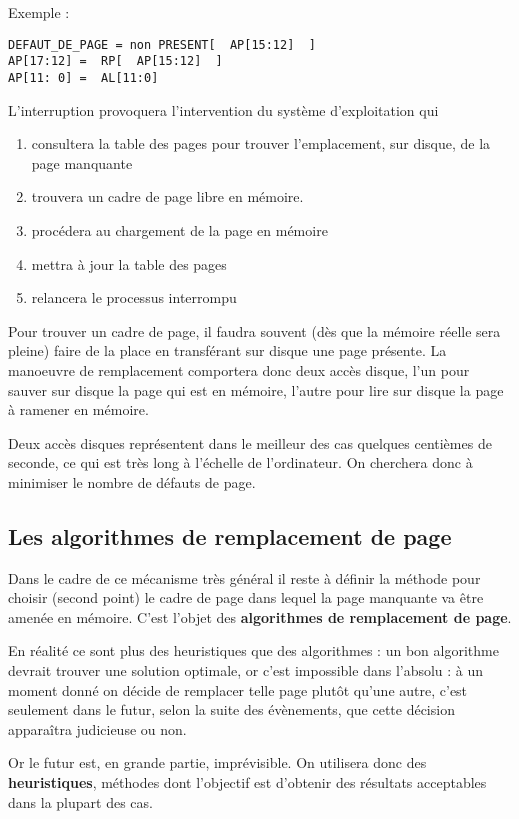 \begin{multicols}{2}
Exemple :

\begin{lstlisting}
DEFAUT_DE_PAGE = non PRESENT[  AP[15:12]  ]
AP[17:12] =  RP[  AP[15:12]  ]
AP[11: 0] =  AL[11:0]
\end{lstlisting}

L'interruption provoquera l'intervention du système d'exploitation qui
\begin{enumerate}
\item consultera la table des pages pour trouver l'emplacement, sur
  disque, de la page manquante
\item trouvera un cadre de page libre en mémoire. 
\item procédera au chargement de la page en mémoire
\item mettra à jour la table des pages
\item relancera le processus interrompu
\end{enumerate}

Pour trouver un cadre de page, il faudra souvent (dès que la mémoire
réelle sera pleine) faire de la place en transférant sur disque une
page présente. La manoeuvre de remplacement comportera donc deux accès
disque, l'un pour sauver sur disque la page qui est en mémoire,
l'autre pour lire sur disque la page à ramener en mémoire.

Deux accès disques représentent dans le meilleur des cas quelques
centièmes de seconde, ce qui est très long à l'échelle de
l'ordinateur. On cherchera donc à minimiser le nombre de  défauts de page.


 
\subsection{Les algorithmes de remplacement de page}

Dans le cadre de ce mécanisme très général il reste à définir la
méthode pour choisir (second point) le cadre de page dans lequel la
page manquante va être amenée en mémoire. C'est l'objet des
\textbf{algorithmes de remplacement de page}.

En réalité ce sont plus des heuristiques que des algorithmes : un bon
algorithme devrait trouver une solution optimale, or c'est impossible
dans l'absolu : à un moment donné on décide de remplacer telle page
plutôt qu'une autre, c'est seulement dans le futur, selon la suite des
évènements, que cette décision apparaîtra
judicieuse ou non.

Or le futur est, en grande partie, imprévisible. On utilisera donc des
\textbf{heuristiques}, méthodes dont l'objectif est d'obtenir des
résultats acceptables dans la plupart des cas.



\end{multicols}
